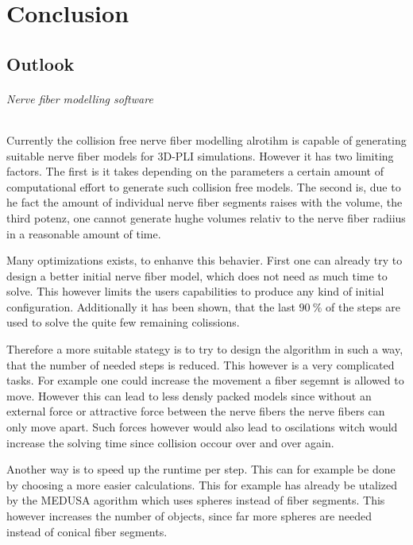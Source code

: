 \newpage\null\thispagestyle{empty}\newpage
\clearpage{\thispagestyle{empty}\cleardoublepage}
\part{Conclusion}
% 
% 
% 
\setcounter{chapter}{8}
\chapter{Outlook}
\label{sec:outlook}
% 
\paragraph{Nerve fiber modelling software}
% 
Currently the collision free nerve fiber modelling alrotihm is capable of generating suitable nerve fiber models for \ac{3D-PLI} simulations.
However it has two limiting factors.
The first is it takes depending on the parameters a certain amount of computational effort to generate such collision free models.
The second is, due to he fact the amount of individual nerve fiber segments raises with the volume, \ie{} the third potenz, one cannot generate hughe volumes relativ to the nerve fiber radiius in a reasonable amount of time.
\par
% 
Many optimizations exists, to enhanve this behavier.
First one can already try to design a better initial nerve fiber model, which does not need as much time to solve.
This however limits the users capabilities to produce any kind of initial configuration. 
Additionally it has been shown, that the last $\SI{90}{\percent}$ of the steps are used to solve the quite few remaining colissions.
\par
% 
Therefore a more suitable stategy is to try to design the algorithm in such a way, that the number of needed steps is reduced.
This however is a very complicated tasks.
For example one could increase the movement a fiber segemnt is allowed to move.
However this can lead to less densly packed models since without an external force or attractive force between the nerve fibers the nerve fibers can only move apart.
Such forces however would also lead to oscilations witch would increase the solving time since collision occour over and over again.
\par
% 
Another way is to speed up the runtime per step.
This can for example be done by choosing a more easier calculations.
This for example has already be utalized by the \ac{MEDUSA} agorithm which uses spheres instead of fiber segments.
This however increases the number of objects, since far more spheres are needed instead of conical fiber segments.
